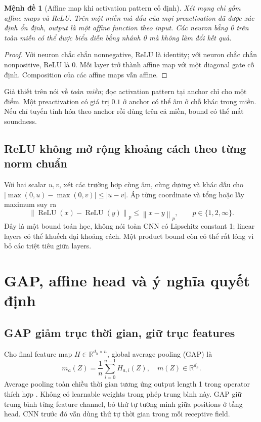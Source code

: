 \documentclass[11pt,a4paper]{article}
\newcommand{\R}{\mathbb R}
\newcommand{\norm}[1]{\left\lVert#1\right\rVert}
\newcommand{\relu}{\operatorname{ReLU}}
\newtheorem{proposition}{Mệnh đề}[section]
\theoremstyle{definition}
\begin{document}
\begin{proposition}[Affine map khi activation pattern cố định]
Xét mạng chỉ gồm affine maps và ReLU. Trên một miền mà dấu của mọi
preactivation đã được xác định ổn định, output là một affine function
theo input. Các neuron bằng 0 trên toàn miền có thể được biểu diễn bằng
nhánh 0 mà không làm đổi kết quả.
\end{proposition}
\begin{proof}
Với neuron chắc chắn nonnegative, ReLU là identity; với neuron chắc
chắn nonpositive, ReLU là 0. Mỗi layer trở thành affine map với một
diagonal gate cố định. Composition của các affine maps vẫn affine.
\end{proof}
Giả thiết trên nói về \emph{toàn miền}; đọc activation pattern tại anchor
chỉ cho một điểm. Một preactivation có giá trị $0.1$ ở anchor có thể âm
ở chỗ khác trong miền. Nếu chỉ tuyến tính hóa theo anchor rồi dùng trên
cả miền, bound có thể mất soundness.

\subsection{ReLU không mở rộng khoảng cách theo từng norm chuẩn}
Với hai scalar $u,v$, xét các trường hợp cùng âm, cùng dương và khác dấu
cho $|\max(0,u)-\max(0,v)|\le|u-v|$. Áp từng coordinate và tổng hoặc lấy
maximum suy ra
\begin{equation}
\norm{\relu(x)-\relu(y)}_p\le\norm{x-y}_p,
\qquad p\in\{1,2,\infty\}.
\end{equation}
Đây là một bound toán học, không nói toàn CNN có Lipschitz constant 1;
linear layers có thể khuếch đại khoảng cách. Một product bound còn có
thể rất lỏng vì bỏ các triệt tiêu giữa layers.

\section{GAP, affine head và ý nghĩa quyết định}
\subsection{GAP giảm trục thời gian, giữ trục features}
Cho final feature map $H\in\R^{d_h\times n}$, global average pooling
(GAP) là
\begin{equation}
m_a(Z)=\frac1n\sum_{i=0}^{n-1}H_{a,i}(Z),\quad
m(Z)\in\R^{d_h}.
\label{eq:gap}
\end{equation}
Average pooling toàn chiều thời gian tương ứng output length 1 trong
operator thích hợp \cite{torchgap}. Không có learnable weights trong
phép trung bình này. GAP giữ trung bình từng feature channel, bỏ thứ tự
tường minh giữa positions ở tầng head. CNN trước đó vẫn dùng thứ tự
thời gian trong mỗi receptive field.
\end{document}
